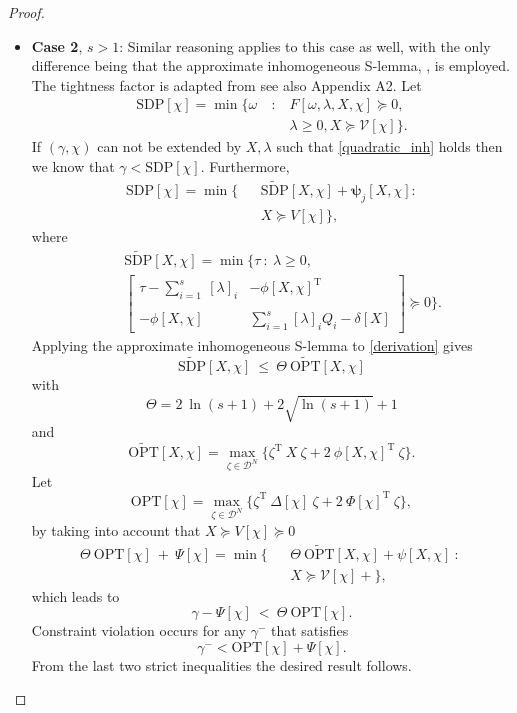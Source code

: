 \documentclass[letterpaper,11pt]{article}
\newcommand{\AR}[2]{\left[\begin{array}{#1}#2\end{array}\right]}
\newcommand{\T}{\mathrm{T}}
\newcommand{\SDP}{\mathrm{SDP}}
\newcommand{\OPT}{\mathrm{OPT}}
\newtheorem{proof}{Proof}
\begin{document}
\begin{proof}
\begin{itemize}
		\item  \textbf{Case 2}, $s > 1$:  Similar reasoning applies 
		to this case as well, 
		with the only difference 
		being that the  approximate inhomogeneous S-lemma, \cite{ bental6},
		is employed.  The tightness factor is adapted from \cite{jud_17}  see also Appendix A2.
		Let 
		\begin{eqnarray*}
			\SDP[\chi]  =  \min \bigg\{ \omega ~& : & ~  
			F[\omega,
			\lambda, X , \chi ] \succeq 0,  \\
			&& ~\lambda \geq 0,  
			X \succeq \mathcal{V}[ \chi]  \bigg\}.
		\end{eqnarray*}
		If $ (\gamma, \chi)$ can not be extended
		by $X, \lambda$ such that  \eqref{quadratic_inh}
		holds then we know that 
		$
		\gamma < \SDP[\chi].
		$
		Furthermore,
		\begin{eqnarray*}
			\SDP[\chi]  =  \min \bigg\{&&  \tilde{\SDP}[X, \chi]  +   \bm{\psi}_j[  X,\chi]  :   \\  	
			&& 	X \succeq V[\chi]  \bigg\},~~
		\end{eqnarray*}
		where	
		\begin{eqnarray}
		\label{derivation}
		&&	\tilde{\SDP}[X, \chi]   =  \min \bigg\{ \tau  ~:~
		\lambda \geq 0, \\
		\nonumber
		&&
		\AR{cc}{\tau - \sum_{i=1}^{s}  ~  [\lambda]_i   & -  \phi[X,  \chi ]^{\T}\\
			& \\
			-\phi[X,  \chi ]& 
			\sum_{i=1}^{s}   [ \lambda]_i   Q_{i}  -  
			\delta[X ] } \succeq 0
		\bigg \}.
		\end{eqnarray}
		Applying the  approximate inhomogeneous S-lemma to \eqref{derivation} gives
		$$
		\tilde{\SDP}[X, \chi]~ \leq~ \Theta ~\tilde{\OPT}[X, \chi]
		$$
		with
		$$
		\Theta = 2 ~ \ln(s+1) + 2 \sqrt{\ln(s+1)} +1
		$$
		and 
		$$
		\tilde{\OPT}[X, \chi] =   \max_{ \zeta \in \mathscr{D}^N }
		\bigg\{  \zeta^\T~
		X ~ 
		\zeta
		+ 2 ~ \phi[X, \chi]^\T ~
		\zeta  \bigg\}.
		$$
		Let 
		$$
		\OPT[\chi] =   \max_{ \zeta \in \mathscr{D}^N }
		\bigg\{  \zeta^\T~
		\Delta[ \chi]  ~ 
		\zeta
		+ 2 ~ \Phi[ \chi]^\T ~
		\zeta  \bigg \},
		$$
		by taking into account that  $	X \succeq V[\chi]   \succeq 0 $
		\begin{eqnarray*}
			\Theta ~ \OPT[\chi] ~+ ~ \Psi[ \chi]  =
			\min \bigg \{ && \Theta ~  \tilde{\OPT}[X, \chi]   +   \psi[  X,\chi]  ~:~    \\
			&& X \succeq  \mathcal{V}[\chi]  +  \bigg\},
		\end{eqnarray*}
		which leads to
		$$
		\gamma -\Psi[ \chi] ~<~ \Theta ~ \OPT[\chi].
		$$
		Constraint violation occurs for any $\gamma^-$ that 
		satisfies $$ \gamma^- < \OPT[\chi] + \Psi[ \chi].
		$$ 
		From the last two strict inequalities the desired result follows. 	
	\end{itemize}
\end{proof}
\end{document}
